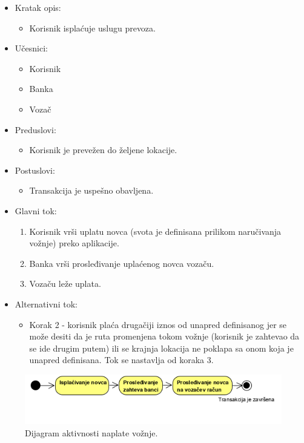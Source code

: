 \begin{itemize}
	\item Kratak opis:
		\begin{itemize}
			\item Korisnik isplaćuje uslugu prevoza.
		\end{itemize}
	\item Učesnici:
		\begin{itemize}
			\item Korisnik
			\item Banka
			\item Vozač
		\end{itemize}				
	\item Preduslovi:
		\begin{itemize}
		    \item Korisnik je prevežen do željene lokacije.
		\end{itemize}
	\item Postuslovi:
		\begin{itemize}
			\item Transakcija je uspešno obavljena.
		\end{itemize}		
	\item Glavni tok:
		\begin{enumerate}
		    \item Korisnik vrši uplatu novca (svota je definisana prilikom naručivanja vožnje) preko aplikacije.
		    \item Banka vrši prosleđivanje uplaćenog novca vozaču.
		    \item Vozaču leže uplata.
		\end{enumerate}
	\item Alternativni tok:
		\begin{itemize}
    		\item Korak 2 - korisnik plaća drugačiji iznos od unapred definisanog jer se može desiti da je ruta promenjena tokom vožnje (korisnik je zahtevao da se ide drugim putem) ili se krajnja lokacija ne poklapa sa onom koja je unapred definisana. Tok se nastavlja od koraka 3.
		\end{itemize}
\end{itemize}

\begin{figure}[H]
\begin{center}
\includegraphics[scale=1.1]{Slike/NaplataVoznje.png}
\end{center}
    \caption{Dijagram aktivnosti naplate vožnje.}
\label{fig:NaplataVožnje}
\end{figure}

